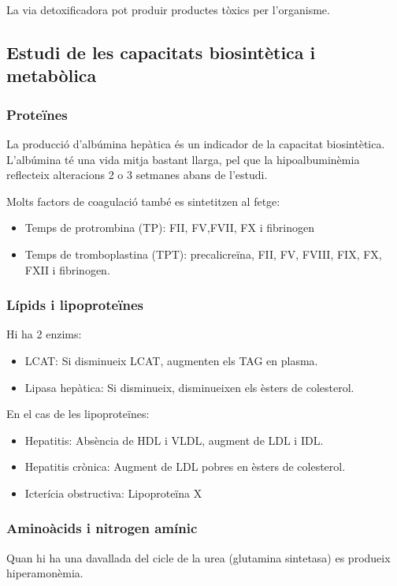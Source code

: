 La via detoxificadora pot produir productes tòxics per l'organisme.

\subsection{Estudi de les capacitats biosintètica i metabòlica}
\label{sec:estudi-de-les}

\subsubsection{Proteïnes}
\label{sec:proteines}
La producció d'albúmina hepàtica és un indicador de la capacitat
biosintètica. L'albúmina té una vida mitja bastant llarga, pel que la
hipoalbuminèmia reflecteix alteracions 2 o 3 setmanes abans de
l'estudi.

Molts factors de coagulació també es sintetitzen al fetge:
\begin{itemize}
\item Temps de protrombina (TP): FII, FV,FVII, FX i fibrinogen
\item Temps de tromboplastina (TPT): precalicreïna, FII, FV, FVIII,
  FIX, FX, FXII i fibrinogen.
\end{itemize}


\subsubsection{Lípids i lipoproteïnes}
\label{sec:lipids-i-lipopr}
Hi ha 2 enzims:
\begin{itemize}
\item LCAT: Si disminueix LCAT, augmenten els TAG en plasma.
\item Lipasa hepàtica: Si disminueix, disminueixen els èsters de colesterol.
\end{itemize}

En el cas de les lipoproteïnes:
\begin{itemize}
\item Hepatitis: Absència de HDL i VLDL, augment de LDL i IDL.
\item Hepatitis crònica: Augment de LDL pobres en èsters de
  colesterol.
\item Icterícia obstructiva: Lipoproteïna X
\end{itemize}

\subsubsection{Aminoàcids i nitrogen amínic}
\label{sec:amin-i-nitr}
Quan hi ha una davallada del cicle de la urea (glutamina sintetasa) es
produeix hiperamonèmia.

